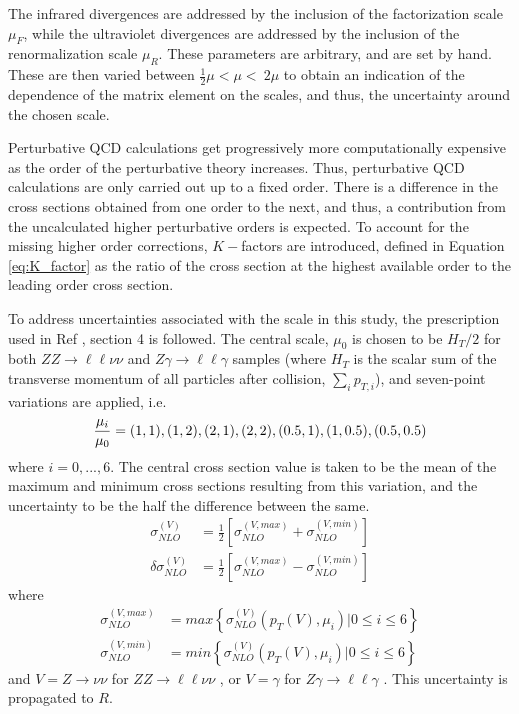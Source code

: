 \documentclass[11pt,a4paper,openright,twoside]{report}
\newcommand{\ZZ}{$ZZ\to \ell\ell\nu\nu$ }
\newcommand{\Zg}{$Z\gamma\to \ell\ell\gamma$ }
\begin{document}
The infrared divergences are addressed by the inclusion of the factorization scale $\mu_F$, while the ultraviolet divergences are addressed by the inclusion of the renormalization scale $\mu_R$. These parameters are arbitrary, and are set by hand. These are then varied between $\frac{1}{2}\mu < \mu < \ 2\mu$ to obtain an indication of the dependence of the matrix element on the scales, and thus, the uncertainty around the chosen scale. 

Perturbative QCD calculations get progressively more computationally expensive as the order of the perturbative theory increases. Thus, perturbative QCD calculations are only carried out up to a fixed order. There is a difference in the cross sections obtained from one order to the next, and thus, a contribution from the uncalculated higher perturbative orders is expected. To account for the missing higher order corrections, $K-$factors are introduced, defined in Equation \ref{eq:K_factor} as the ratio of the cross section at the highest available order to the leading order cross section.

To address uncertainties associated with the scale in this study, the prescription used in Ref \cite{precise_scale}, section 4 is followed. The central scale, $\mu_0$ is chosen to be $H_{T}/2$ for both \ZZ and \Zg samples (where $H_T$ is the scalar sum of the transverse momentum of all particles after collision, $\sum_{i} p_{T,i}$), and seven-point variations are applied, i.e.
\begin{equation}
\frac{\mu_i}{\mu_0} = (1,1),(1,2),(2,1),(2,2),(0.5,1),(1,0.5),(0.5,0.5)\\
\label{eq:scale}
\end{equation}
where $i=0,...,6$. The central cross section value is taken to be the mean of the maximum and minimum cross sections resulting from this variation, and the uncertainty to be the half the difference between the same.
\begin{align}
\sigma_{NLO}^{(V)} &= \frac{1}{2}\left[\sigma_{NLO}^{(V,max)} + \sigma_{NLO}^{(V,min)}\right]\label{eq:scale_central}\\
\delta\sigma_{NLO}^{(V)} &= \frac{1}{2}\left[\sigma_{NLO}^{(V,max)} - \sigma_{NLO}^{(V,min)}\right]
\label{eq:scale_central2}
\end{align}
where
\begin{align}
\sigma_{NLO}^{(V,max)} &= max\left\lbrace\sigma_{NLO}^{(V)}(p_{T}(V),\mu_i)|0\leq i \leq 6\right\rbrace\\
\sigma_{NLO}^{(V,min)} &= min\left\lbrace\sigma_{NLO}^{(V)}(p_{T}(V),\mu_i)|0\leq i \leq 6\right\rbrace
\end{align}
and $V = Z\to\nu\nu$ for \ZZ, or $V = \gamma$ for \Zg. This uncertainty is propagated to $R$.
\end{document}
